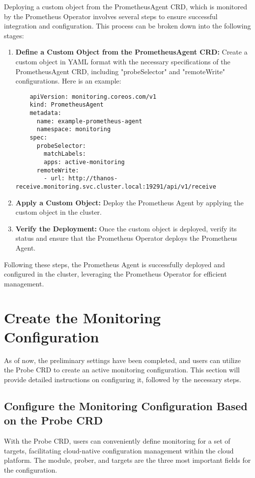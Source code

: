 Deploying a custom object from the PrometheusAgent \ac{CRD}, which is monitored by the Prometheus Operator involves several steps to ensure successful integration and configuration. This process can be broken down into the following stages:

\begin{enumerate}
\item \textbf{Define a Custom Object from the PrometheusAgent \ac{CRD}:}
Create a custom object in YAML format with the necessary specifications of the PrometheusAgent \ac{CRD}, including "probeSelector" and "remoteWrite" configurations. Here is an example:
\begin{lstlisting}
    apiVersion: monitoring.coreos.com/v1
    kind: PrometheusAgent
    metadata:
      name: example-prometheus-agent
      namespace: monitoring
    spec:
      probeSelector:
        matchLabels:
        apps: active-monitoring
      remoteWrite:
        - url: http://thanos-receive.monitoring.svc.cluster.local:19291/api/v1/receive
\end{lstlisting}
\item \textbf{Apply a Custom Object:}
Deploy the Prometheus Agent by applying the custom object in the cluster. 
\item \textbf{Verify the Deployment:}
Once the custom object is deployed, verify its status and ensure that the Prometheus Operator deploys the Prometheus Agent. 
\end{enumerate}

Following these steps, the Prometheus Agent is successfully deployed and configured in the cluster, leveraging the Prometheus Operator for efficient management. 

\section{Create the Monitoring Configuration}

As of now, the preliminary settings have been completed, and users can utilize the Probe \ac{CRD} to create an active monitoring configuration. This section will provide detailed instructions on configuring it, followed by the necessary steps. 

\subsection{Configure the Monitoring Configuration Based on the Probe \ac{CRD}}

With the Probe \ac{CRD}, users can conveniently define monitoring for a set of targets, facilitating cloud-native configuration management within the cloud platform. The module, prober, and targets are the three most important fields for the configuration. 

